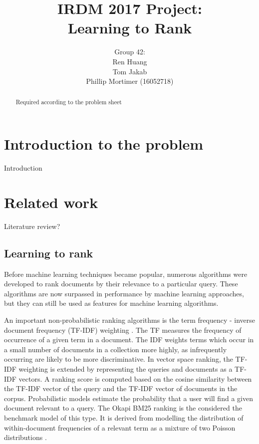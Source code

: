 \documentclass[english]{article}
\theoremstyle{definition}
\begin{document}
\title{IRDM 2017 Project:\\Learning to Rank
}
\author{Group 42:\\
Ren Huang \\
Tom Jakab\\
Phillip Mortimer (16052718)}
\maketitle
\begin{abstract}
Required according to the problem sheet
\end{abstract}

\section{Introduction to the problem}

Introduction

\section{Related work}

Literature review?

\subsection{Learning to rank}

Before machine learning techniques became popular, numerous algorithms were developed to rank documents by their relevance to a particular query.  These algorithms are now surpassed in performance by machine learning approaches, but they can still be used as features for machine learning algorithms. 

An important non-probabilistic ranking algorithms is the term frequency - inverse document frequency (TF-IDF) weighting \cite{tfidf}.  The TF measures the frequency of occurrence of a given term in a document.  The IDF weights terms which occur in a small number of documents in a collection more highly, as infrequently occurring are likely to be more discriminative.  In vector space ranking, the TF-IDF weighting is extended by representing the queries and documents as a TF-IDF vectors.   A ranking score is computed based on the cosine similarity between the TF-IDF vector of the query and the TF-IDF vector of documents in the corpus.  Probabilistic models estimate the probability that a user will find a given document relevant to a query.  The Okapi BM25 ranking is the considered the benchmark model of this type.  It is derived from modelling the distribution of within-document frequencies of a relevant
term as a mixture of two Poisson distributions \cite{robertson1993okapi}.
\end{document}

